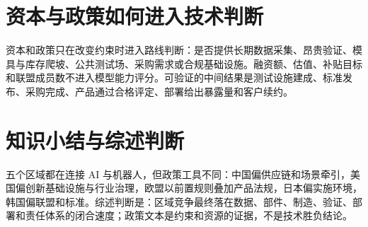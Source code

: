 \section{资本与政策如何进入技术判断}

资本和政策只在改变约束时进入路线判断：是否提供长期数据采集、昂贵验证、模具与库存爬坡、公共测试场、采购需求或合规基础设施。融资额、估值、补贴目标和联盟成员数不进入模型能力评分。可验证的中间结果是测试设施建成、标准发布、采购完成、产品通过合格评定、部署给出暴露量和客户续约。

\section{知识小结与综述判断}

五个区域都在连接 AI 与机器人，但政策工具不同：中国偏供应链和场景牵引，美国偏创新基础设施与行业治理，欧盟以前置规则叠加产品法规，日本偏实施环境，韩国偏联盟和标准。综述判断是：区域竞争最终落在数据、部件、制造、验证、部署和责任体系的闭合速度；政策文本是约束和资源的证据，不是技术胜负结论。

